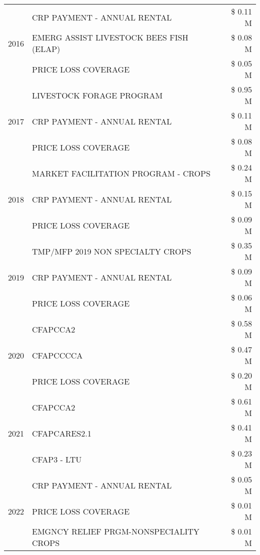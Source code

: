 \begin{tabular}{llr}
\cline{1-3}
\multirow[t]{3}{*}{2016} & CRP PAYMENT - ANNUAL RENTAL & \$ 0.11 M \\
 & EMERG ASSIST LIVESTOCK BEES FISH (ELAP) & \$ 0.08 M \\
 & PRICE LOSS COVERAGE & \$ 0.05 M \\
\cline{1-3}
\multirow[t]{3}{*}{2017} & LIVESTOCK FORAGE PROGRAM & \$ 0.95 M \\
 & CRP PAYMENT - ANNUAL RENTAL & \$ 0.11 M \\
 & PRICE LOSS COVERAGE & \$ 0.08 M \\
\cline{1-3}
\multirow[t]{3}{*}{2018} & MARKET FACILITATION PROGRAM - CROPS & \$ 0.24 M \\
 & CRP PAYMENT - ANNUAL RENTAL & \$ 0.15 M \\
 & PRICE LOSS COVERAGE & \$ 0.09 M \\
\cline{1-3}
\multirow[t]{3}{*}{2019} & TMP/MFP 2019 NON SPECIALTY CROPS & \$ 0.35 M \\
 & CRP PAYMENT - ANNUAL RENTAL & \$ 0.09 M \\
 & PRICE LOSS COVERAGE & \$ 0.06 M \\
\cline{1-3}
\multirow[t]{3}{*}{2020} & CFAPCCA2 & \$ 0.58 M \\
 & CFAPCCCCA & \$ 0.47 M \\
 & PRICE LOSS COVERAGE & \$ 0.20 M \\
\cline{1-3}
\multirow[t]{3}{*}{2021} & CFAPCCA2 & \$ 0.61 M \\
 & CFAPCARES2.1 & \$ 0.41 M \\
 & CFAP3 - LTU & \$ 0.23 M \\
\cline{1-3}
\multirow[t]{3}{*}{2022} & CRP PAYMENT - ANNUAL RENTAL & \$ 0.05 M \\
 & PRICE LOSS COVERAGE & \$ 0.01 M \\
 & EMGNCY RELIEF PRGM-NONSPECIALITY CROPS & \$ 0.01 M \\
\cline{1-3}
\bottomrule
\end{tabular}
